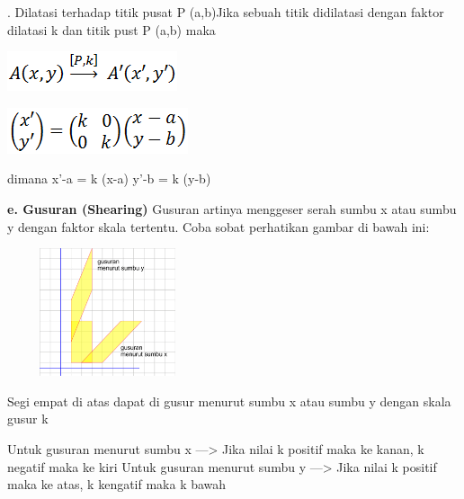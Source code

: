 \documentclass[11pt,fleqn]{book} %
\begin{document}
. Dilatasi terhadap titik pusat P (a,b)Jika sebuah titik didilatasi dengan faktor dilatasi k dan titik pust P (a,b) maka
\noindent
\begin{center}
\includegraphics{Pictures/12.PNG}\\
\end{center}

\noindent
\begin{center}
\includegraphics{Pictures/13.PNG}\\
\end{center}

\noindent
\noindent dimana
\noindent x’-a = k (x-a)
\noindent y’-b = k (y-b)

\noindent \textbf{e. Gusuran (Shearing)}
\noindent Gusuran artinya menggeser serah sumbu x atau sumbu y dengan faktor skala tertentu. Coba sobat perhatikan gambar di bawah ini:

\noindent
\begin{center}
	\noindent \includegraphics*[width=2.32in, height=1.48in, keepaspectratio=false, trim=0.00in 0.11in 0.00in 0.00in]{Pictures/14.PNG}
\end{center}
\noindent 
Segi empat di atas dapat di gusur menurut sumbu x atau sumbu y dengan skala gusur k

\noindent
\noindent Untuk gusuran menurut sumbu x —> Jika nilai k positif maka ke kanan, k negatif maka ke kiri
\noindent Untuk gusuran menurut sumbu y —> Jika nilai k positif maka ke atas, k kengatif maka k bawah
\end{document}
